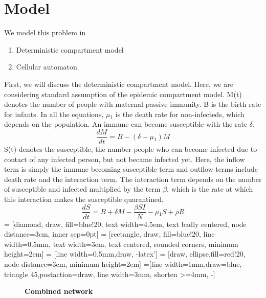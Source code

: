 \documentclass[prl,12pt,citeautoscript,reprint]{revtex4-1}
\begin{document}
\section{Model}
We model this problem in \begin{enumerate}
    \item Deterministic compartment model
    \item Cellular automaton.
\end{enumerate}
First, we will discuss the deterministic compartment model. 
Here, we are considering standard assumption of the epidemic compartment model.
M(t) denotes the number of people with maternal passive immunity. B is the birth rate for infants. In all the equations, $\mu{_1}$ is the death rate for non-infecteds, which depends on the population. An immune can become susceptible with the rate $\delta$.    
$$\frac{dM}{dt} = B -(\delta - \mu{_1}) M$$
S(t) denotes the susceptible, the number people who can become infected due to contact of any infected person, but not became infected yet. Here, the inflow term is simply the immune becoming susceptible term and outflow terms include death rate and the interaction term. The interaction term depends on the number of susceptible and infected multiplied by the term $\beta$, which is the rate at which this interaction makes the susceptible quarantined. 
$$\frac{dS}{dt} = B + \delta M -\frac{\beta S I}{N} - \mu{_1} S + \rho R$$
 = [diamond, draw, fill=blue!20, 
    text width=4.5em, text badly centered, node distance=3cm, inner sep=0pt]
 = [rectangle, draw, fill=blue!20, line width=0.5mm,
    text width=3em, text centered, rounded corners, minimum height=2em]
 = [line width=0.5mm,draw, -latex']
 = [draw, ellipse,fill=red!20, node distance=3cm,
    minimum height=2em]
=[line width=1mm,draw=blue,-triangle 45,postaction={draw, line width=3mm, shorten >=4mm, -}]


\begin{figure}[H]    
\begin{center}


 \caption{\textbf{Combined network}}
  \label{fig:arcc}
  \end{center}

\end{figure}
\end{document}
